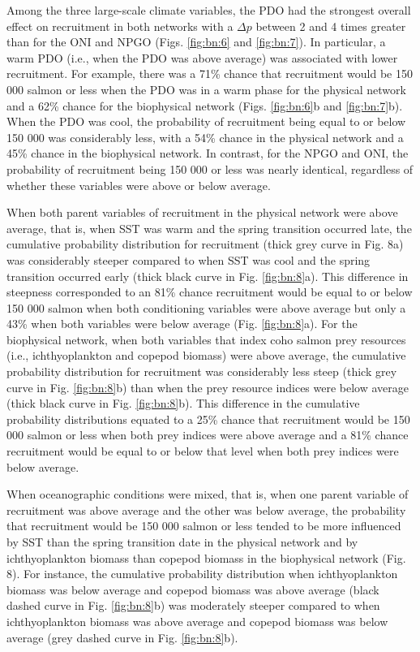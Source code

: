 Among the three large-scale climate variables, the PDO had the strongest overall
effect on recruitment in both networks with a \(\Delta p\) between 2 and 4 times
greater than for the ONI and NPGO (Figs. \ref{fig:bn:6} and \ref{fig:bn:7}). In particular, a warm PDO (i.e.,
when the PDO was above average) was associated with lower recruitment. For
example, there was a 71\% chance that recruitment would be 150 000 salmon or
less when the PDO was in a warm phase for the physical network and a 62\% chance
for the biophysical network (Figs. \ref{fig:bn:6}b and \ref{fig:bn:7}b). When the PDO was cool, the
probability of recruitment being equal to or below 150 000 was considerably
less, with a 54\% chance in the physical network and a 45\% chance in the
biophysical network. In contrast, for the NPGO and ONI, the probability of
recruitment being 150 000 or less was nearly identical, regardless of whether
these variables were above or below average.

When both parent variables of recruitment in the physical network were above
average, that is, when SST was warm and the spring transition occurred late, the
cumulative probability distribution for recruitment (thick grey curve in Fig.
8a) was considerably steeper compared to when SST was cool and the spring
transition occurred early (thick black curve in Fig. \ref{fig:bn:8}a). This difference in
steepness corresponded to an 81\% chance recruitment would be equal to or below
150 000 salmon when both conditioning variables were above average but only a
43\% when both variables were below average (Fig. \ref{fig:bn:8}a). For the biophysical
network, when both variables that index coho salmon prey resources (i.e.,
ichthyoplankton and copepod biomass) were above average, the cumulative
probability distribution for recruitment was considerably less steep (thick grey
curve in Fig. \ref{fig:bn:8}b) than when the prey resource indices were below average (thick
black curve in Fig. \ref{fig:bn:8}b). This difference in the cumulative probability
distributions equated to a 25\% chance that recruitment would be 150 000 salmon
or less when both prey indices were above average and a 81\% chance recruitment
would be equal to or below that level when both prey indices were below average.

When oceanographic conditions were mixed, that is, when one parent variable of
recruitment was above average and the other was below average, the probability
that recruitment would be 150 000 salmon or less tended to be more influenced by
SST than the spring transition date in the physical network and by
ichthyoplankton biomass than copepod biomass in the biophysical network (Fig.
8). For instance, the cumulative probability distribution when ichthyoplankton
biomass was below average and copepod biomass was above average (black dashed
curve in Fig. \ref{fig:bn:8}b) was moderately steeper compared to when ichthyoplankton
biomass was above average and copepod biomass was below average (grey dashed
curve in Fig. \ref{fig:bn:8}b).


